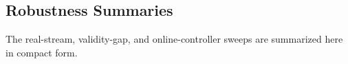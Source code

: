 

\FloatBarrier

\subsection{Robustness Summaries}

The real-stream, validity-gap, and online-controller sweeps are summarized here
in compact form.








